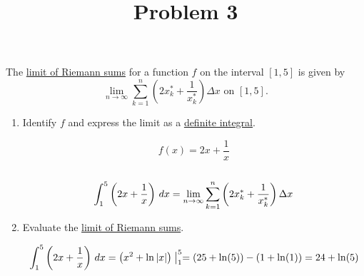 \documentclass{ximera}
\title[Problem 3]{Problem 3}
\begin{document}
\begin{abstract} \end{abstract}
\maketitle


\begin{problem}
  The \underline{limit of Riemann sums} for a function $f$ on the interval $[1, 5]$ is given by
  \[
    \lim_{n \to\infty} \sum_{k = 1}^n \left(2x_k^* + \frac{1}{x_k^*} \right) \Delta x\mbox{ on $[1, 5]$.}
  \]
  \begin{enumerate}
    \item
      Identify $f$ and express the limit as a \underline{definite integral}.
      \begin{explanation}
       
        $$f(x)=2x+\frac{1}{x}$$\\
        $$\int_1^5 \left( 2x + \frac{1}{x} \right) \,d x = \lim_{n \to \infty} \sum_{k = 1}^n \left(2x_k^* + \frac{1}{x_k^*} \right) \Delta x$$
      
      \end{explanation}
\item
    Evaluate the \underline{limit of Riemann sums}.
    \begin{explanation}
      \[
        \int_1^5 \left( 2x + \frac{1}{x} \right) \,d x = \left(x^2 + \ln|x|\right) \bigm|_1^5 = (25 + \ln(5)) - (1 +\ln(1)) = 24 +\ln(5)
      \]
    \end{explanation}
  \end{enumerate}
  
\end{problem}
\end{document}
